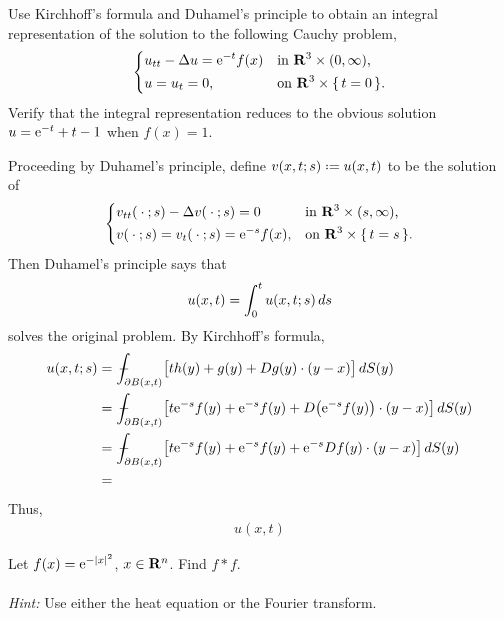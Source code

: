 \begin{problem}
  Use Kirchhoff's formula and Duhamel's principle to obtain an integral
  representation of the solution to the following Cauchy problem,
  \[
    \left\{
      \begin{aligned}
        &u_{tt}-\Delta u=\mathrm{e}^{-t}f(x)&&\text{in \(\mathbf{R}^3\times(0,\infty)\),}\\
        &u=u_t=0,&&\text{on \(\mathbf{R}^3\times\{\,t=0\,\}\).}
      \end{aligned}
    \right.
  \]
  Verify that the integral representation reduces to the obvious solution
  \(u=\mathrm{e}^{-t}+t-1\) when \(f(x)=1\).
\end{problem}
\begin{solution*}
  Proceeding by Duhamel's principle, define \(v(x,t;s)\defeq u(x,t)\) to be
  the solution of
  \[
    \left\{
      \begin{aligned}
        &v_{tt}(\blank;s)-\Lap v(\blank;s)=0%
        &&\text{in \(\R^3\times(s,\infty)\),}\\
        &v(\blank;s)
        =v_t(\blank;s)=\rme^{-s}f(x),
        &&\text{on \(\R^3\times\{\,t=s\,\}\).}
      \end{aligned}
    \right.
  \]
  Then Duhamel's principle says that
  \[
    u(x,t)=\int_0^t u(x,t;s)\mathop{}\!d s
  \]
  solves the original problem. By Kirchhoff's formula,
  \begin{align*}
    u(x,t;s)
    &=\fint_{\partial B(x,t)}%
    \bigl[%
    th(y)+g(y)+Dg(y)\cdot(y-x)
      \bigr]\diff S(y)\\
    &=\fint_{\partial B(x,t)}
      \bigl[%
      t\rme^{-s}f(y)+\rme^{-s}f(y)
      +D\bigl(\rme^{-s}f(y)\bigr)\cdot (y-x)
      \bigr]\diff S(y)\\
    &=\fint_{\partial B(x,t)}
      \bigl[%
      t\rme^{-s}f(y)+\rme^{-s}f(y)
      +\rme^{-s}D f(y)\cdot (y-x)
      \bigr]\diff S(y)\\
    &=
  \end{align*}
  Thus,
  \begin{align*}
    u(x,t)
  \end{align*}
\end{solution*}

\begin{problem}
  Let \(f(x)=\mathrm{e}^{-|x|^2}\), \(x\in\mathbf{R}^n\). Find \(f*f\).
  \\\\
  \emph{Hint:} Use either the heat equation or the Fourier transform.
\end{problem}
\begin{solution*}
\end{solution*}

